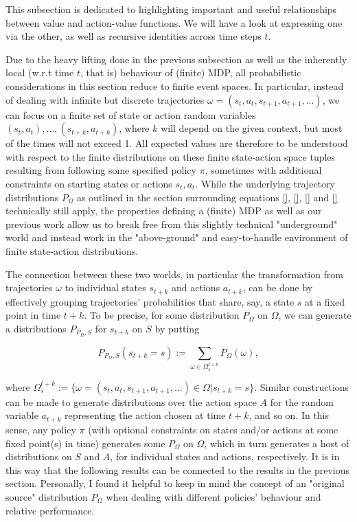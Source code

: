 \documentclass[11pt]{article} %
\begin{document}
This subsection is dedicated to highlighting important and useful relationships between value and action-value functions. We will have a look at expressing one via the other, as well as recursive identities across time steps $t$. 

Due to the heavy lifting done in the previous subsection as well as the inherently local (w.r.t time $t$, that is) behaviour of (finite) MDP, all probabilistic considerations in this section reduce to finite event spaces. In particular, instead of dealing with infinite but discrete trajectories $\omega = (s_t,a_t,s_{t+1},a_{t+1},\dots)$, we can focus on a finite set of state or action random variables $(s_t,a_t),\dots,(s_{t+k},a_{t+k})$, where $k$ will depend on the given context, but most of the times will not exceed 1. All expected values are therefore to be understood with respect to the finite distributions on these finite state-action space tuples  resulting from following some specified policy $\pi$, sometimes with additional constraints on starting states or actions $s_t, a_t$. While the underlying trajectory distributions $P_\Omega$ as outlined in the section surrounding equations \ref{}, \ref{}, \ref{} and \ref{} technically still apply, the properties defining a (finite) MDP as well as our previous work allow us to break free from this slightly technical "underground" world and instead work in the "above-ground" and easy-to-handle environment of finite state-action distributions. 

The connection between these two worlds, in particular the transformation from trajectories $\omega$ to individual states $s_{t+k}$ and actions $a_{t+k}$, can be done by effectively grouping trajectories' probabilities that share, say, a state $s$ at a fixed point in time $t+k$. To be precise, for some distribution $P_\Omega$ on $\Omega$, we can generate a distributions $P_{P_\Omega,S}$ for $s_{t+k}$ on $S$ by putting

\begin{equation}
	P_{P_\Omega,S}(s_{t+k} = s) := \sum_{\omega \in \Omega^{t+k}_s} P_\Omega(\omega),
\end{equation}

where $\Omega^{t+k}_s := \{\omega = (s_t,a_t,s_{t+1},a_{t+1},\dots) \in \Omega | s_{t+k} = s\}$. Similar constructions can be made to generate distributions over the action space $A$ for the random variable $a_{t+k}$ representing the action chosen at time $t+k$, and so on. In this sense, any policy $\pi$ (with optional constraints on states and/or actions at some fixed point(s) in time) generates some $P_\Omega$ on $\Omega$, which in turn generates a host of distributions on $S$ and $A$, for individual states and actions, respectively. It is in this way that the following results can be connected to the results in the previous section. Personally, I found it helpful to keep in mind the concept of an "original source" distribution $P_\Omega$ when dealing with different policies' behaviour and relative performance.
\end{document}
